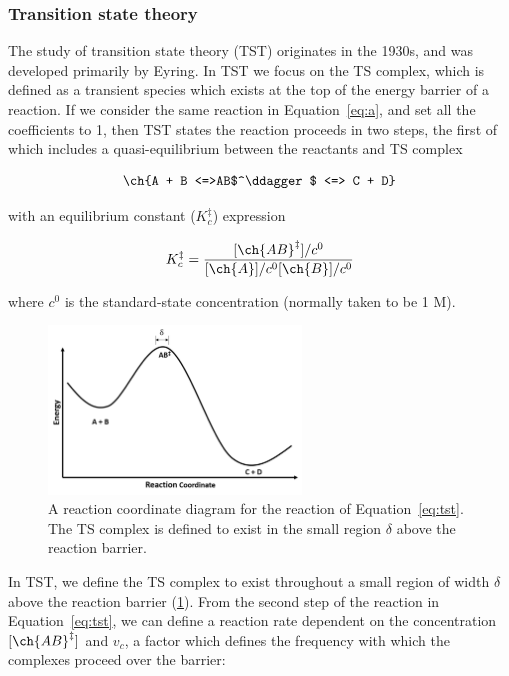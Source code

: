 \subsubsection{Transition state theory}

The study of transition state theory (TST) originates in the 1930s, and was developed primarily by Eyring.\cite{McQuarrie1997,Steinfeld1998} In TST we focus on the TS complex, which is defined as a transient species which exists at the top of the energy barrier of a reaction. If we consider the same reaction in Equation~\ref{eq:a}, and set all the coefficients to 1, then TST states the reaction proceeds in two steps, the first of which includes a quasi-equilibrium between the reactants and TS complex

\begin{equation}
  \ch{A + B <=>AB$^\ddagger$ <=> C + D}
  \label{eq:tst}
\end{equation}

\noindent with an equilibrium constant ($K_c^{\ddagger}$) expression

\begin{equation}
  K_c^{\ddagger} = \frac{[\ch{AB}^\ddagger]/c^0}{[\ch{A}]/c^0[\ch{B}]/c^0}
\label{eq:K}
\end{equation}

\noindent where $c^0$ is the standard-state concentration (normally taken to be 1 M).

\begin{figure}[htb]
    \centering
    \includegraphics[width=0.6\textwidth]{figures/TST-PES.png}
    \caption[A reaction coordinate diagram for a generic reaction.]{A reaction coordinate diagram for the reaction of Equation~\ref{eq:tst}. The TS complex is defined to exist in the small region $\delta$ above the reaction barrier.}
\label{fig:tst-pes}
\end{figure}

In TST, we define the TS complex to exist throughout a small region of width $\delta$ above the reaction barrier (\ref{fig:tst-pes}). From the second step of the reaction in Equation~\ref{eq:tst}, we can define a reaction rate dependent on the concentration $[\ch{AB}^\ddagger]$ and $v_c$, a factor which defines the frequency with which the complexes proceed over the barrier:

